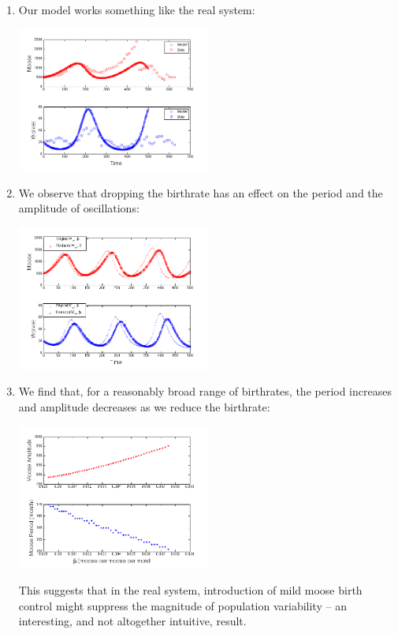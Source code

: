 \documentclass{tufte-handout}
\newcommand{\beforefig}{\vspace{0.2in}}
\begin{document}
\begin{enumerate} 
\item Our model works something like the real system:

\beforefig

\centerline{\includegraphics[width=2.5in]{figs/ModelDataComparison}} 


 
\item We observe that dropping the birthrate has an effect on the period and the amplitude of oscillations:

\beforefig

\centerline{\includegraphics[width=2.5in]{figs/MooseBCTimeSeries}}

\item We find that, for a reasonably broad range of birthrates, the period increases and amplitude decreases as we reduce the birthrate:

\beforefig

\centerline{\includegraphics[width=2.5in]{figs/MooseBCSweepClean}}

  This suggests that in the real system, introduction of mild moose birth control might suppress the magnitude of population variability -- an interesting, and not altogether intuitive, result.


\end{enumerate}
\end{document}

